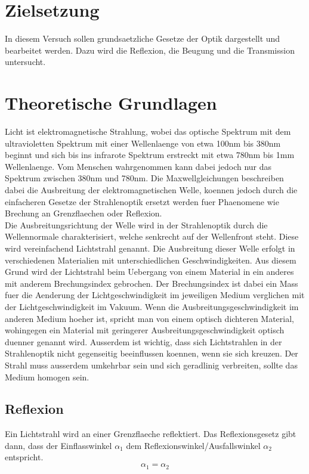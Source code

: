 \section{Zielsetzung}
In diesem Versuch sollen grundsaetzliche Gesetze der Optik dargestellt und bearbeitet werden. Dazu wird die Reflexion, die Beugung und die Transmission untersucht.
\section{Theoretische Grundlagen}
Licht ist elektromagnetische Strahlung, wobei das optische Spektrum mit dem ultravioletten Spektrum mit einer Wellenlaenge von etwa 100nm bis 380nm beginnt und sich bis ins infrarote Spektrum erstreckt mit etwa 780nm bis 1mm Wellenlaenge. Vom Menschen wahrgenommen kann dabei jedoch nur das Spektrum zwischen 380nm und 780nm. Die Maxwellgleichungen beschreiben dabei die Ausbreitung der elektromagnetischen Welle, koennen jedoch durch die einfacheren Gesetze der Strahlenoptik ersetzt werden fuer Phaenomene wie Brechung an Grenzflaechen oder Reflexion.\\
Die Ausbreitungsrichtung der Welle wird in der Strahlenoptik durch die Wellennormale charakterisiert, welche senkrecht auf der Wellenfront steht. Diese wird vereinfachend Lichtstrahl genannt. Die Ausbreitung dieser Welle erfolgt in verschiedenen Materialien mit unterschiedlichen Geschwindigkeiten. Aus diesem Grund wird der Lichtstrahl beim Uebergang von einem Material in ein anderes mit anderem Brechungsindex gebrochen. Der Brechungsindex ist dabei ein Mass fuer die Aenderung der Lichtgeschwindigkeit im jeweiligen Medium verglichen mit der Lichtgeschwindigkeit im Vakuum. Wenn die Ausbreitungsgeschwindigkeit im anderen Medium hoeher ist, spricht man von einem optisch dichteren Material, wohingegen ein Material mit geringerer Ausbreitungsgeschwindigkeit optisch duenner genannt wird. Ausserdem ist wichtig, dass sich Lichtstrahlen in der Strahlenoptik nicht gegenseitig beeinflussen koennen, wenn sie sich kreuzen. Der Strahl muss ausserdem umkehrbar sein und sich geradlinig verbreiten, sollte das Medium homogen sein.
\newpage \subsection{Reflexion}
Ein Lichtstrahl wird an einer Grenzflaeche reflektiert. Das Reflexionsgesetz gibt dann, dass der Einflasswinkel $\alpha_1$ dem Reflexionswinkel/Ausfallswinkel $\alpha_2$ entspricht.
\begin{equation}
    \alpha_1=\alpha_2 \label{Reflexion}
\end{equation}
